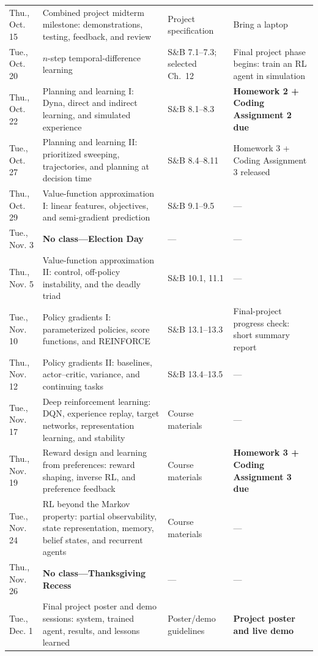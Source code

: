 \documentclass[11pt]{article}
\begin{document}
\begin{longtable}{@{}>{\raggedright\arraybackslash}p{0.72in} >{\raggedright\arraybackslash}p{2.30in} >{\raggedright\arraybackslash}p{1.05in} >{\raggedright\arraybackslash}p{2.05in}@{}}
\rowcolor{milestonebg}
Thu., Oct. 15 & Combined project midterm milestone: demonstrations, testing, feedback, and review & Project specification & Bring a laptop \\
Tue., Oct. 20 & $n$-step temporal-difference learning & S\&B 7.1--7.3; selected Ch.~12 & Final project phase begins: train an RL agent in simulation \\
Thu., Oct. 22 & Planning and learning I: Dyna, direct and indirect learning, and simulated experience & S\&B 8.1--8.3 & \textbf{Homework 2 + Coding Assignment 2 due} \\
Tue., Oct. 27 & Planning and learning II: prioritized sweeping, trajectories, and planning at decision time & S\&B 8.4--8.11 & Homework 3 + Coding Assignment 3 released \\
Thu., Oct. 29 & Value-function approximation I: linear features, objectives, and semi-gradient prediction & S\&B 9.1--9.5 & --- \\
\rowcolor{noclassbg}
Tue., Nov. 3 & \textbf{No class---Election Day} & --- & --- \\
Thu., Nov. 5 & Value-function approximation II: control, off-policy instability, and the deadly triad & S\&B 10.1, 11.1 & --- \\
Tue., Nov. 10 & Policy gradients I: parameterized policies, score functions, and REINFORCE & S\&B 13.1--13.3 & Final-project progress check: short summary report \\
Thu., Nov. 12 & Policy gradients II: baselines, actor--critic, variance, and continuing tasks & S\&B 13.4--13.5 & --- \\
Tue., Nov. 17 & Deep reinforcement learning: DQN, experience replay, target networks, representation learning, and stability & Course materials & --- \\
Thu., Nov. 19 & Reward design and learning from preferences: reward shaping, inverse RL, and preference feedback & Course materials & \textbf{Homework 3 + Coding Assignment 3 due} \\
Tue., Nov. 24 & RL beyond the Markov property: partial observability, state representation, memory, belief states, and recurrent agents & Course materials & --- \\
\rowcolor{noclassbg}
Thu., Nov. 26 & \textbf{No class---Thanksgiving Recess} & --- & --- \\
\rowcolor{milestonebg}
Tue., Dec. 1 & Final project poster and demo sessions: system, trained agent, results, and lessons learned & Poster/demo guidelines & \textbf{Project poster and live demo} \\

\end{longtable}
\normalsize
\end{document}

